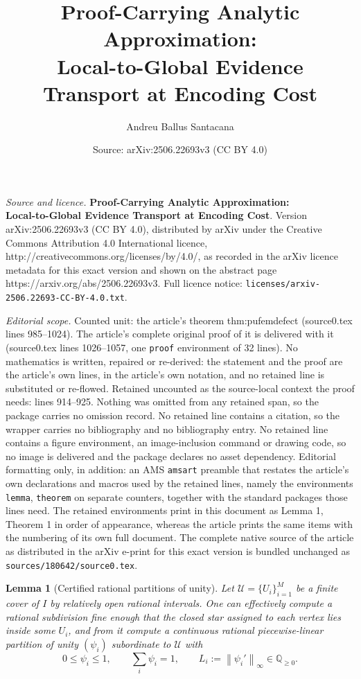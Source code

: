 \documentclass[10pt,a4paper]{amsart}
\title{\textbf{Proof-Carrying Analytic Approximation:}\\\textbf{Local-to-Global Evidence Transport at Encoding Cost}}
\author{Andreu Ballus Santacana}
\date{Source: arXiv:2506.22693v3 (CC BY 4.0)}
\newtheorem{lemma}{Lemma}
\newcommand{\Q}{\mathbb{Q}}
\newcommand{\norm}[1]{\left\lVert #1 \right\rVert}
\begin{document}
\maketitle

\noindent\emph{Source and licence.} \textbf{Proof-Carrying Analytic Approximation:}\\\textbf{Local-to-Global Evidence Transport at Encoding Cost}. Version arXiv:2506.22693v3 (CC BY 4.0), distributed by arXiv under the Creative Commons Attribution 4.0 International licence, http://creativecommons.org/licenses/by/4.0/, as recorded in the arXiv licence metadata for this exact version and shown on the abstract page https://arxiv.org/abs/2506.22693v3. Full licence notice: \texttt{licenses/arxiv-2506.22693-CC-BY-4.0.txt}.\par\smallskip

\noindent\textit{Editorial scope.} Counted unit: the article's theorem thm:pufemdefect (source0.tex lines 985--1024). The article's complete original proof of it is delivered with it (source0.tex lines 1026--1057, one \texttt{proof} environment of 32 lines). No mathematics is written, repaired or re-derived: the statement and the proof are the article's own lines, in the article's own notation, and no retained line is substituted or re-flowed.  Retained uncounted as the source-local context the proof needs: lines 914--925.  Nothing was omitted from any retained span, so the package carries no omission record.  No retained line contains a citation, so the wrapper carries no bibliography and no bibliography entry.  No retained line contains a figure environment, an image-inclusion command or drawing code, so no image is delivered and the package declares no asset dependency.  Editorial formatting only, in addition: an AMS \texttt{amsart} preamble that restates the article's own declarations and macros used by the retained lines, namely the environments \texttt{lemma}, \texttt{theorem} on separate counters, together with the standard packages those lines need.  The retained environments print in this document as Lemma 1, Theorem 1 in order of appearance, whereas the article prints the same items with the numbering of its own full document.  The complete native source of the article as distributed in the arXiv e-print for this exact version is bundled unchanged as \texttt{sources/180642/source0.tex}.
\begin{lemma}[Certified rational partitions of unity]\label{lem:rationalPOU}
Let $\mathcal U=\{U_i\}_{i=1}^M$ be a finite cover of $I$ by relatively open rational
intervals.  One can effectively compute a rational subdivision fine enough that the closed star assigned to
each vertex lies inside some $U_i$, and from it compute a continuous rational piecewise-linear
partition of unity $(\psi_i)$ subordinate to $\mathcal U$ with
\[
 0\le\psi_i\le1,
 \qquad \sum_i\psi_i=1,
 \qquad
 L_i:=\norm{\psi_i'}_\infty\in\Q_{\ge0}.
\]
\end{lemma}
\end{document}
